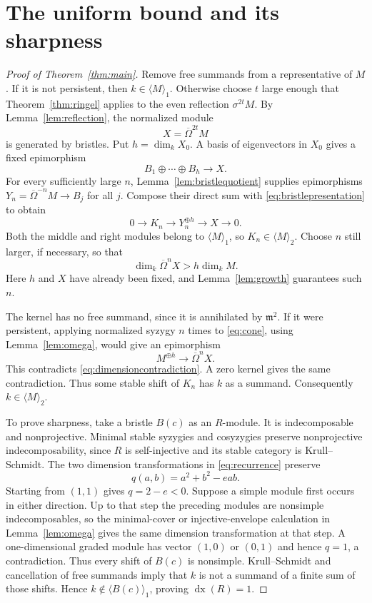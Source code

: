 \documentclass[11pt]{article}
\theoremstyle{definition}\newtheorem{definition}[theorem]{Definition}
\theoremstyle{remark}\newtheorem{remark}[theorem]{Remark}
\newcommand{\m}{\mathfrak m}
\newcommand{\dx}{\operatorname{dx}}
\newcommand{\Om}{\overline\Omega}
\begin{document}
\section{The uniform bound and its sharpness}
\begin{proof}[Proof of Theorem~\ref{thm:main}]
Remove free summands from a representative of $M$. If it is not persistent, then $k\in\langle M\rangle_1$. Otherwise choose $t$ large enough that Theorem~\ref{thm:ringel} applies to the even reflection $\sigma^{2t}M$. By Lemma~\ref{lem:reflection}, the normalized module
\[
 X=\Om^{2t}M
\]
is generated by bristles. Put $h=\dim_kX_0$. A basis of eigenvectors in $X_0$ gives a fixed epimorphism
\begin{equation}\label{eq:bristlepresentation}
 B_1\oplus\cdots\oplus B_h\longrightarrow X.
\end{equation}
For every sufficiently large $n$, Lemma~\ref{lem:bristlequotient} supplies epimorphisms $Y_n=\Om^{-n}M\to B_j$ for all $j$. Compose their direct sum with \eqref{eq:bristlepresentation} to obtain
\begin{equation}\label{eq:cone}
 0\longrightarrow K_n\longrightarrow Y_n^{\oplus h}\longrightarrow X\longrightarrow0.
\end{equation}
Both the middle and right modules belong to $\langle M\rangle_1$, so $K_n\in\langle M\rangle_2$. Choose $n$ still larger, if necessary, so that
\begin{equation}\label{eq:dimensioncontradiction}
 \dim_k\Om^nX>h\dim_kM.
\end{equation}
Here $h$ and $X$ have already been fixed, and Lemma~\ref{lem:growth} guarantees such $n$.

The kernel has no free summand, since it is annihilated by $\m^2$. If it were persistent, applying normalized syzygy $n$ times to \eqref{eq:cone}, using Lemma~\ref{lem:omega}, would give an epimorphism
\[
 M^{\oplus h}\longrightarrow\Om^nX.
\]
This contradicts \eqref{eq:dimensioncontradiction}. A zero kernel gives the same contradiction. Thus some stable shift of $K_n$ has $k$ as a summand. Consequently $k\in\langle M\rangle_2$.

To prove sharpness, take a bristle $B(c)$ as an $R$-module. It is indecomposable and nonprojective. Minimal stable syzygies and cosyzygies preserve nonprojective indecomposability, since $R$ is self-injective and its stable category is Krull--Schmidt. The two dimension transformations in \eqref{eq:recurrence} preserve
\[
 q(a,b)=a^2+b^2-eab.
\]
Starting from $(1,1)$ gives $q=2-e<0$. Suppose a simple module first occurs in either direction. Up to that step the preceding modules are nonsimple indecomposables, so the minimal-cover or injective-envelope calculation in Lemma~\ref{lem:omega} gives the same dimension transformation at that step. A one-dimensional graded module has vector $(1,0)$ or $(0,1)$ and hence $q=1$, a contradiction. Thus every shift of $B(c)$ is nonsimple. Krull--Schmidt and cancellation of free summands imply that $k$ is not a summand of a finite sum of those shifts. Hence $k\notin\langle B(c)\rangle_1$, proving $\dx(R)=1$.


\end{proof}
\end{document}
